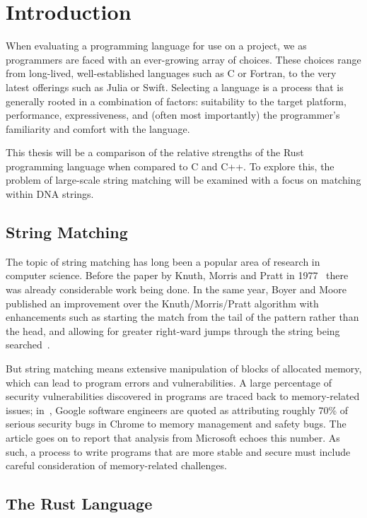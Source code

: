 \section{Introduction}
\label{sec:introduction}

When evaluating a programming language for use on a project, we as programmers are faced with an ever-growing array of choices. These choices range from long-lived, well-established languages such as C or Fortran, to the very latest offerings such as Julia or Swift. Selecting a language is a process that is generally rooted in a combination of factors: suitability to the target platform, performance, expressiveness, and (often most importantly) the programmer's familiarity and comfort with the language.

This thesis will be a comparison of the relative strengths of the Rust programming language when compared to C and C++. To explore this, the problem of large-scale string matching will be examined with a focus on matching within DNA strings.

\subsection{String Matching}

The topic of string matching has long been a popular area of research in computer science. Before the paper by Knuth, Morris and Pratt in 1977~\cite{knuth.morris.pratt.1977} there was already considerable work being done. In the same year, Boyer and Moore published an improvement over the Knuth/Morris/Pratt algorithm with enhancements such as starting the match from the tail of the pattern rather than the head, and allowing for greater right-ward jumps through the string being searched~\cite{boyer.moore.1977}.

But string matching means extensive manipulation of blocks of allocated memory, which can lead to program errors and vulnerabilities. A large percentage of security vulnerabilities discovered in programs are traced back to memory-related issues; in~\cite{cimpanu.2020}, Google software engineers are quoted as attributing roughly 70\% of serious security bugs in Chrome to memory management and safety bugs. The article goes on to report that analysis from Microsoft echoes this number. As such, a process to write programs that are more stable and secure must include careful consideration of memory-related challenges.

\subsection{The Rust Language}
